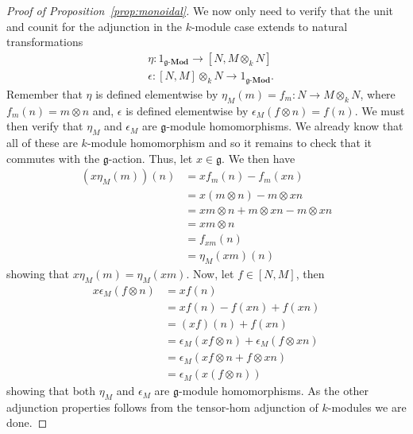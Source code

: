 \begin{proof}[Proof of Proposition~\ref{prop:monoidal}]
  We now only need to verify that the unit and counit for the adjunction in the $ k $-module case extends to natural transformations
  \begin{align*}
    &\eta: 1_{\mathfrak{g}\text{-}\mathbf{Mod}} \to [N, M \otimes_k N]  \\
    &\epsilon: [N, M] \otimes_k N \to 1_{\mathfrak{g}\text{-}\mathbf{Mod}}
  .\end{align*}
  Remember that $ \eta $ is defined elementwise by $ \eta_M(m)=f_m: N \to M \otimes_k N $, where $ f_m(n) = m \otimes n $ and, $ \epsilon $ is defined elementwise by $ \epsilon_M(f \otimes n)= f(n) $. We must then verify that $ \eta_M $ and $ \epsilon_M $ are $ \mathfrak{g} $-module homomorphisms. We already know that all of these are $ k $-module homomorphism and so it remains to check that it commutes with the $ \mathfrak{g} $-action. Thus, let $ x \in \mathfrak{g} $. We then have
  \begin{align*}
    (x\eta_M(m))(n) &= xf_m(n) - f_m(xn) \\
                    &= x(m \otimes n) - m \otimes xn \\
                    &= xm \otimes n + m \otimes xn - m \otimes xn \\
                    &= xm \otimes n \\
                    &= f_{xm}(n) \\
                    &= \eta_M(xm)(n)
  \end{align*}
  showing that $ x\eta_M(m) = \eta_M(xm) $. Now, let $ f \in [N, M] $, then
  \begin{align*}
    x\epsilon_M(f \otimes n) &= xf(n) \\
                             &= xf(n) - f(xn) + f(xn) \\
                             &= (xf)(n) + f(xn) \\
                             &= \epsilon_M(xf \otimes n) + \epsilon_M(f \otimes xn) \\
                             &= \epsilon_M(xf \otimes n + f \otimes xn) \\
                             &= \epsilon_M(x(f \otimes n))
  \end{align*}
  showing that both $ \eta_M $ and $ \epsilon_M $ are $ \mathfrak{g} $-module homomorphisms. As the other adjunction properties follows from the tensor-hom adjunction of $ k $-modules we are done.
\end{proof}

